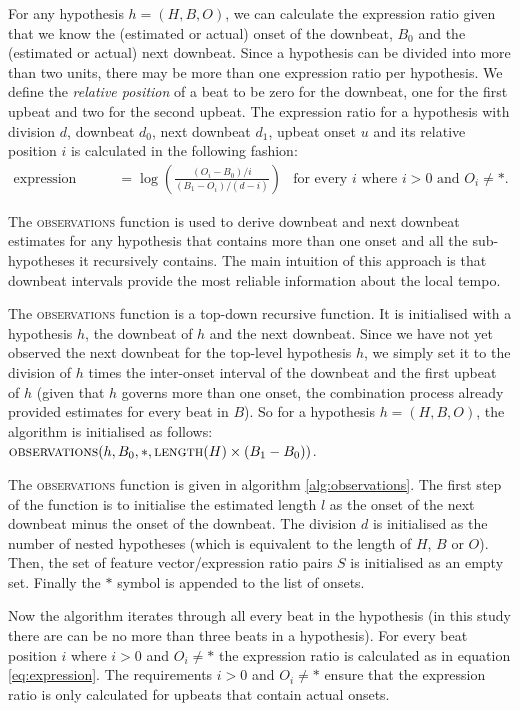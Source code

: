 For any hypothesis $h = (H, B, O)$, we can calculate the expression ratio given that we know the (estimated or actual) onset of the downbeat, $B_0$ and the (estimated or actual) next downbeat. Since a hypothesis can be divided into more than two units, there may be more than one expression ratio per hypothesis. We define the \textit{relative position} of a beat to be zero for the downbeat, one for the first upbeat and two for the second upbeat. The expression ratio for a hypothesis with division $d$, downbeat $d_0$, next downbeat $d_1$, upbeat onset $u$ and its relative position $i$ is calculated in the following fashion:
\begin{align}
\label{eq:expression}
\mbox{expression ratio} &= \log\left(\frac{(O_i - B_0) / i}{(B_1 - O_i) / (d - i)}\right) & \text{for every $i$ where $i > 0$ and $O_i \neq *$.}
\end{align}

The \textsc{observations} function is used to derive downbeat and next downbeat estimates for any hypothesis that contains more than one onset and all the sub-hypotheses it recursively contains. The main intuition of this approach is that downbeat intervals provide the most reliable information about the local tempo. 

The \textsc{observations} function is a top-down recursive function. It is initialised with a hypothesis $h$, the downbeat of $h$ and the next downbeat. Since we have not yet observed the next downbeat for the top-level hypothesis $h$, we simply set it to the division of $h$ times the inter-onset interval of the downbeat and the first upbeat of $h$ (given that $h$ governs more than one onset, the combination process already provided estimates for every beat in $B$). So for a hypothesis $h = (H, B, O)$, the algorithm is initialised as follows: $\textsc{observations}(h, B_0, *, \textsc{length}(H) \times (B_1 - B_0))$.

The \textsc{observations} function is given in algorithm \ref{alg:observations}. The first step of the function is to initialise the estimated length $l$ as the onset of the next downbeat minus the onset of the downbeat. The division $d$ is initialised as the number of nested hypotheses (which is equivalent to the length of $H$, $B$ or $O$). Then, the set of feature vector/expression ratio pairs $S$ is initialised as an empty set. Finally the $*$ symbol is appended to the list of onsets.

Now the algorithm iterates through all every beat in the hypothesis (in this study there are can be no more than three beats in a hypothesis). For every beat position $i$ where $i > 0$ and $O_i \neq *$ the expression ratio is calculated as in equation \ref{eq:expression}. The requirements $i > 0$ and $O_i \neq *$ ensure that the expression ratio is only calculated for upbeats that contain actual onsets. 

